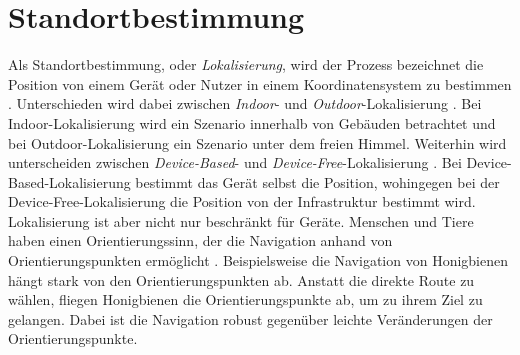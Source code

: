 \chapter{Standortbestimmung}
Als Standortbestimmung, oder \textit{Lokalisierung}, wird der Prozess bezeichnet die Position von einem Gerät oder Nutzer in einem Koordinatensystem zu bestimmen \cite{bulusu2000gps}.
Unterschieden wird dabei zwischen \textit{Indoor}- und \textit{Outdoor}-Lokalisierung \cite{zafari2019survey, bulusu2000gps}.
Bei Indoor-Lokalisierung wird ein Szenario innerhalb von Gebäuden betrachtet und bei Outdoor-Lokalisierung ein Szenario unter dem freien Himmel.
\newline
\newline
Weiterhin wird unterscheiden zwischen \textit{Device-Based}- und \textit{Device-Free}-Lokalisierung \cite{xiao2016survey}.
Bei Device-Based-Lokalisierung bestimmt das Gerät selbst die Position, wohingegen bei der Device-Free-Lokalisierung
die Position von der Infrastruktur bestimmt wird.
\newline
\newline
Lokalisierung ist aber nicht nur beschränkt für Geräte.
Menschen und Tiere haben einen Orientierungssinn, der die Navigation anhand von Orientierungspunkten ermöglicht \cite{menzel1996knowledge}.
Beispielsweise die Navigation von Honigbienen hängt stark von den Orientierungspunkten ab.
Anstatt die direkte Route zu wählen, fliegen Honigbienen die Orientierungspunkte ab, um zu ihrem Ziel zu gelangen.
Dabei ist die Navigation robust gegenüber leichte Veränderungen der Orientierungspunkte.



